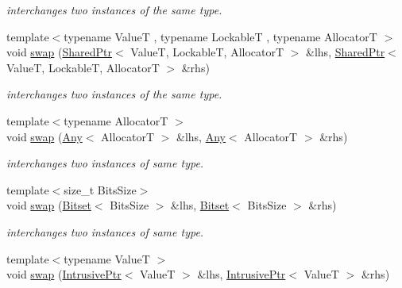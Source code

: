 \begin{DoxyCompactItemize}
\begin{DoxyCompactList}\small\item\em interchanges two instances of the same type. \end{DoxyCompactList}\item 
\hypertarget{namespacehryky_a9b664f13ed500d03858655608fb26a2b}{{\footnotesize template$<$typename Value\-T , typename Lockable\-T , typename Allocator\-T $>$ }\\void \hyperlink{namespacehryky_a9b664f13ed500d03858655608fb26a2b}{swap} (\hyperlink{classhryky_1_1_shared_ptr}{Shared\-Ptr}$<$ Value\-T, Lockable\-T, Allocator\-T $>$ \&lhs, \hyperlink{classhryky_1_1_shared_ptr}{Shared\-Ptr}$<$ Value\-T, Lockable\-T, Allocator\-T $>$ \&rhs)}\label{namespacehryky_a9b664f13ed500d03858655608fb26a2b}

\begin{DoxyCompactList}\small\item\em interchanges two instances of the same type. \end{DoxyCompactList}\item 
{\footnotesize template$<$typename Allocator\-T $>$ }\\void \hyperlink{namespacehryky_a68071169aba55a56c4fb370a89c8a387}{swap} (\hyperlink{classhryky_1_1_any}{Any}$<$ Allocator\-T $>$ \&lhs, \hyperlink{classhryky_1_1_any}{Any}$<$ Allocator\-T $>$ \&rhs)
\begin{DoxyCompactList}\small\item\em interchanges two instances of same type. \end{DoxyCompactList}\item 
{\footnotesize template$<$size\-\_\-t Bits\-Size$>$ }\\void \hyperlink{namespacehryky_a73dbc149899a54cca88e0c14c00bb173}{swap} (\hyperlink{classhryky_1_1_bitset}{Bitset}$<$ Bits\-Size $>$ \&lhs, \hyperlink{classhryky_1_1_bitset}{Bitset}$<$ Bits\-Size $>$ \&rhs)
\begin{DoxyCompactList}\small\item\em interchanges two instances of same type. \end{DoxyCompactList}\item 
\hypertarget{namespacehryky_a25ffda8718a68348345dae8a0b651e17}{{\footnotesize template$<$typename Value\-T $>$ }\\void \hyperlink{namespacehryky_a25ffda8718a68348345dae8a0b651e17}{swap} (\hyperlink{classhryky_1_1_intrusive_ptr}{Intrusive\-Ptr}$<$ Value\-T $>$ \&lhs, \hyperlink{classhryky_1_1_intrusive_ptr}{Intrusive\-Ptr}$<$ Value\-T $>$ \&rhs)}\label{namespacehryky_a25ffda8718a68348345dae8a0b651e17}


\end{DoxyCompactItemize}
